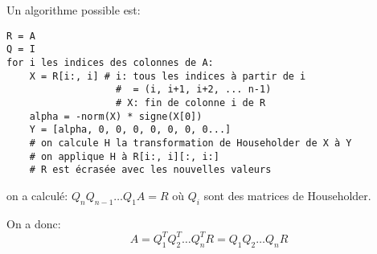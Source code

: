 \documentclass[a4paper,10pt,french,openany]{memoir}
\begin{document}
Un algorithme possible est:
\begin{lstlisting}
R = A
Q = I
for i les indices des colonnes de A:
    X = R[i:, i] # i: tous les indices à partir de i
                   #  = (i, i+1, i+2, ... n-1)
                   # X: fin de colonne i de R
    alpha = -norm(X) * signe(X[0])
    Y = [alpha, 0, 0, 0, 0, 0, 0, 0...]
    # on calcule H la transformation de Householder de X à Y
    # on applique H à R[i:, i][:, i:]
    # R est écrasée avec les nouvelles valeurs
\end{lstlisting}
on a calculé: $Q_n Q_{n-1} \dots Q_1 A = R$ où $Q_i$ sont des matrices de Householder.

On a donc: \[ A = Q_1^T Q_2^T \dots Q_n^T R = Q_1 Q_2 \dots Q_n R \]
\end{document}
